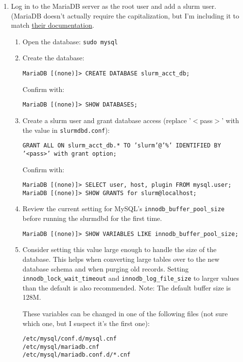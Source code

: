 \begin{enumerate}
  \item Log in to the MariaDB server as the root user and add a slurm user. (MariaDB doesn't actually require the capitalization, but I'm including it to match \href{https://mariadb.com/kb/en/library/account-management-sql-commands/}{their documentation}.

    \begin{enumerate}
      \item Open the database: \texttt{sudo mysql} %

      \item Create the database:

        \texttt{MariaDB [(none)]> CREATE DATABASE slurm\_acct\_db;}
	
        Confirm with:

        \texttt{MariaDB [(none)]> SHOW DATABASES;}
	
      \item Create a slurm user and grant database access (replace '$<$pass$>$' with the value in \texttt{slurmdbd.conf}):

        \texttt{GRANT ALL ON slurm\_acct\_db.* TO 'slurm'@'\%' IDENTIFIED BY '<pass>' with grant option;}
	
        Confirm with:

        \texttt{MariaDB [(none)]> SELECT user, host, plugin FROM mysql.user;} \\
        \texttt{MariaDB [(none)]> SHOW GRANTS for slurm@localhost;}

      \item Review the current setting for MySQL's \texttt{innodb\_buffer\_pool\_size} before running the slurmdbd for the first time.

        \texttt{MariaDB [(none)]> SHOW VARIABLES LIKE innodb\_buffer\_pool\_size;}

      \item Consider setting this value large enough to handle the size of the database. This helps when converting large tables over to the new database schema and when purging old records. Setting \texttt{innodb\_lock\_wait\_timeout} and \texttt{innodb\_log\_file\_size} to larger values than the default is also recommended. Note: The default buffer size is 128M.

        These variables can be changed in one of the following files (not sure which one, but I suspect it's the first one):

        \texttt{/etc/mysql/conf.d/mysql.cnf} \\
        \texttt{/etc/mysql/mariadb.cnf} \\
        \texttt{/etc/mysql/mariadb.conf.d/*.cnf}


\end{enumerate}
\end{enumerate}
